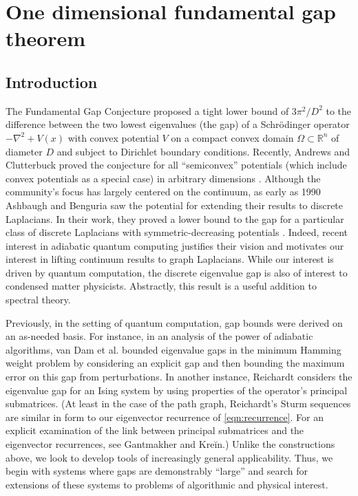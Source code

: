 
\newtheorem{fact}{Fact}

\newcommand{\size}[1]{\left\lvert #1 \right\rvert}
\newcommand{\graph}[2]{\mathbb{#1}_{#2}}
\newcommand{\intset}[2]{\left \llbracket #1 , #2 \right \rrbracket}

\chapter{One dimensional fundamental gap theorem}

\section{Introduction}
  The Fundamental Gap Conjecture proposed a tight lower bound of $3\pi^2/D^2$ to the difference between the two lowest eigenvalues (the gap) of a Schr\"{o}dinger operator $-\nabla^2 + V(x)$ with convex potential $V$ on a compact convex domain $\Omega \subset \mathbb{R}^n$ of diameter $D$ and subject to Dirichlet boundary conditions. Recently, Andrews and Clutterbuck proved the conjecture for all ``semiconvex'' potentials (which include convex potentials as a special case) in arbitrary dimensions \cite{Andrews2011}. Although the community's focus has largely centered on the continuum\cite{Andrews2011, Lavine1994, ashbaugh1989optimal, Yu1986}, as early as 1990 Ashbaugh and Benguria saw the potential for extending their results to discrete Laplacians. In their work, they proved a lower bound to the gap for a particular class of discrete Laplacians with symmetric-decreasing potentials \cite{ashbaugh1990some}. Indeed, recent interest in adiabatic quantum computing justifies their vision and motivates our interest in lifting continuum results to graph Laplacians\cite{Farhi_science, FGG02}. While our interest is driven by quantum computation, the discrete eigenvalue gap is also of interest to condensed matter physicists. Abstractly, this result is a useful addition to spectral theory.

  Previously, in the setting of quantum computation, gap bounds were derived on an as-needed basis. For instance, in an analysis of the power of adiabatic algorithms, van Dam et al. bounded eigenvalue gaps in the minimum Hamming weight problem by considering an explicit gap and then bounding the maximum error on this gap from perturbations\cite{DMV01}. In another instance, Reichardt considers the eigenvalue gap for an Ising system by using properties of the operator's principal submatrices\cite{R04}. (At least in the case of the path graph, Reichardt's Sturm sequences are similar in form to our eigenvector recurrence of \cref{eqn:recurrence}. For an explicit examination of the link between principal submatrices and the eigenvector recurrences, see Gantmakher and Kre\u{i}n\cite{gantmakher2002oscillation}.) Unlike the constructions above, we look to develop tools of increasingly general applicability. Thus, we begin with systems where gaps are demonstrably ``large'' and search for extensions of these systems to problems of algorithmic and physical interest.

